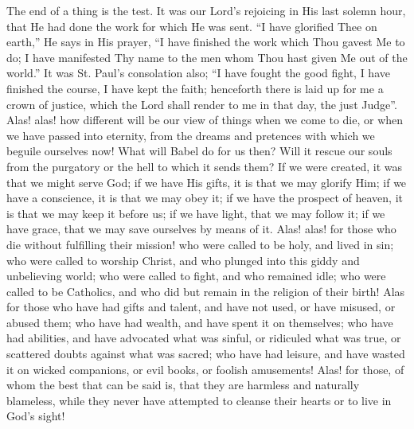 The end of a thing is the test. It was our Lord's rejoicing in His
last solemn hour, that He had done the work for which He was sent.
``I have glorified Thee on earth,'' He says in His prayer,
``I have finished the work which Thou gavest Me to do; I have
manifested Thy name to the men whom Thou hast given Me out of the
world.'' It was St. Paul's consolation also; ``I have fought
the good fight, I have finished the course, I have kept the faith;
henceforth there is laid up for me a crown of justice, which the Lord
shall render to me in that day, the just Judge''. Alas! alas! how
different will be our view of things when we come to die, or when we
have passed into eternity, from the dreams and pretences with which we
beguile ourselves now! What will Babel do for us then? Will it rescue
our souls from the purgatory or the hell to which it sends them? If we
were created, it was that we might serve God; if we have His gifts, it
is that we may glorify Him; if we have a conscience, it is that we may
obey it; if we have the prospect of heaven, it is that we may keep it
before us; if we have light, that we may follow it; if we have grace,
that we may save ourselves by means of it. Alas! alas! for those who
die without fulfilling their mission! who were called to be holy, and
lived in sin; who were called to worship Christ, and who plunged into
this giddy and unbelieving world; who were called to fight, and who
remained idle; who were called to be Catholics, and who did but remain
in the religion of their birth! Alas for those who have had gifts and
talent, and have not used, or have misused, or abused them; who have
had wealth, and have spent it on themselves; who have had abilities,
and have advocated what was sinful, or ridiculed what was true, or
scattered doubts against what was sacred; who have had leisure, and
have wasted it on wicked companions, or evil books, or foolish
amusements! Alas! for those, of whom the best that can be said is,
that they are harmless and naturally blameless, while they never have
attempted to cleanse their hearts or to live in God's sight!


